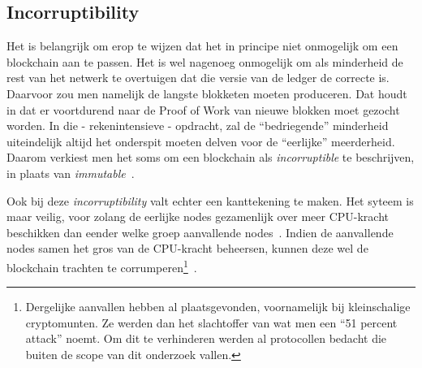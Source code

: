 \subsection{Incorruptibility}
\label{sub:incorruptibility}

Het is belangrijk om erop te wijzen dat het in principe niet onmogelijk om een blockchain aan te passen. Het is wel nagenoeg onmogelijk om als minderheid de rest van het netwerk te overtuigen dat die versie van de ledger de correcte is. Daarvoor zou men namelijk de langste blokketen moeten produceren. Dat houdt in dat er voortdurend naar de Proof of Work van nieuwe blokken moet gezocht worden. In die - rekenintensieve - opdracht, zal de ``bedriegende'' minderheid uiteindelijk altijd het onderspit moeten delven voor de ``eerlijke'' meerderheid. Daarom verkiest men het soms om een blockchain als \textit{incorruptible} te beschrijven, in plaats van \textit{immutable}~\autocite{Salem2008}.

Ook bij deze \textit{incorruptibility} valt echter een kanttekening te maken. Het syteem is maar veilig, voor zolang de eerlijke nodes gezamenlijk over meer CPU-kracht beschikken dan eender welke groep aanvallende nodes~\autocite{Nakamoto2008}. Indien de aanvallende nodes samen het gros van de CPU-kracht beheersen, kunnen deze wel de blockchain trachten te corrumperen\footnote{Dergelijke aanvallen hebben al plaatsgevonden, voornamelijk bij kleinschalige cryptomunten. Ze werden dan het slachtoffer van wat men een ``51 percent attack'' noemt. Om dit te verhinderen werden al protocollen bedacht die buiten de scope van dit onderzoek vallen.}~\autocite{Anita2019}.


